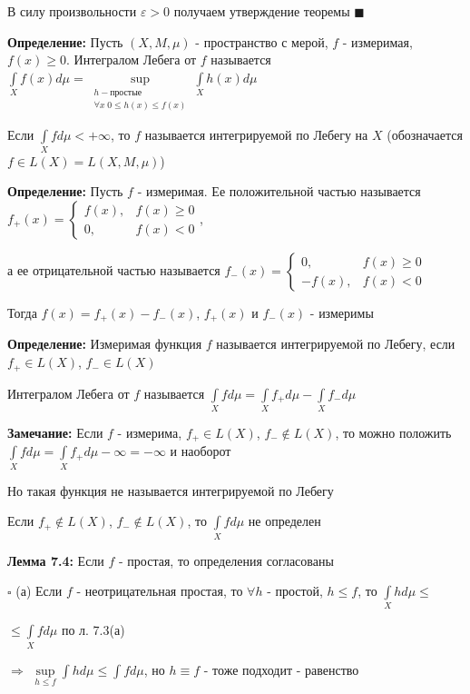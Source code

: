 \documentclass[a4paper]{report}
\begin{document}
В силу произвольности $\varepsilon>0$ получаем утверждение теоремы $\blacksquare$
\bigskip

\noindent\textbf{Определение:} Пусть $(X,M,\mu)$ - пространство с мерой, $f$ - измеримая, $f(x)\ge0$. Интегралом Лебега от $f$ называется $\displaystyle\int\limits_X f(x)d\mu=\sup\limits_{\substack{h - \text{простые}\\ \forall x\; 0\le h(x)\le f(x)}}\displaystyle\int\limits_X h(x)d\mu$

Если $\displaystyle\int\limits_X fd\mu<+\infty$, то $f$ называется интегрируемой по Лебегу на $X$ (обозначается $f\in L(X)=L(X,M,\mu)$)
\bigskip

\noindent\textbf{Определение:} Пусть $f$ - измеримая. Ее положительной частью называется $f_+(x)=\begin{cases}f(x),&f(x)\ge0\\0,&f(x)<0\end{cases}$, 

а ее отрицательной частью называется $f_-(x)=\begin{cases}0,&f(x)\ge0\\-f(x),&f(x)<0\end{cases}$

Тогда $f(x)=f_+(x)-f_-(x)$, $f_+(x)$ и $f_-(x)$ - измеримы
\bigskip

\noindent\textbf{Определение:} Измеримая функция $f$ называется интегрируемой по Лебегу, если $f_+\in L(X)$, $f_-\in L(X)$

Интегралом Лебега от $f$ называется $\displaystyle\int\limits_X fd\mu=\displaystyle\int\limits_X f_+d\mu-\displaystyle\int\limits_X f_-d\mu$
\bigskip

\noindent\textbf{Замечание:} Если $f$ - измерима, $f_+\in L(X)$, $f_-\notin L(X)$, то можно положить $\displaystyle\int\limits_X fd\mu=\displaystyle\int\limits_X f_+d\mu-\infty=-\infty$ и наоборот

Но такая функция не называется интегрируемой по Лебегу

Если $f_+\notin L(X)$, $f_-\notin L(X)$, то $\displaystyle\int\limits_X fd\mu$ не определен
\bigskip

\noindent\textbf{Лемма 7.4:} Если $f$ - простая, то определения согласованы

\noindent $\square$ (а) Если $f$ - неотрицательная простая, то $\forall h$ - простой, $h\le f$, то $\displaystyle\int\limits_X hd\mu\le$

\noindent $\le\displaystyle\int\limits_X fd\mu$ по л. 7.3(а)

$\Rightarrow$ $\sup\limits_{h\le f}\displaystyle\int hd\mu\le\displaystyle\int fd\mu$, но $h\equiv f$ - тоже подходит - равенство
\end{document}
